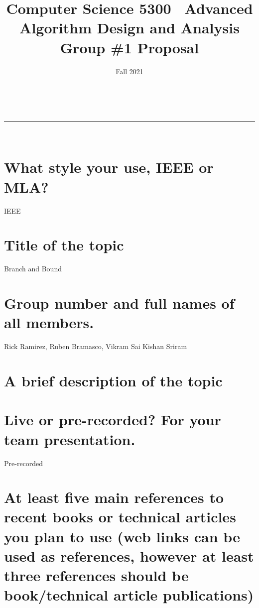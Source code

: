 \documentclass[11pt]{article}
\title{Computer Science 5300
\partition\
    Advanced Algorithm Design and Analysis\\
    \vspace{1ex}
    Group \#1 Proposal}
\author{\small }
\date{Fall 2021}
\makeatletter
\newcommand{\partition}{\rule{\linewidth}{0.8pt}}
\renewcommand{\maketitle}{
    \begin{center}
        \@date \hfill  \@author\\
        {\Large \textsc{\@title}}
        \partition\\
    \end{center}
}
\makeatother
\begin{document}
    \maketitle
    \section{What style your use, IEEE or MLA?}
        IEEE
    \section{Title of the topic}
        Branch and Bound
    \section{Group number and full names of all members.}
        Rick Ramirez, Ruben Bramasco, Vikram Sai Kishan Sriram
    \section{A brief description of the topic}
    \section{Live or pre-recorded? For your team presentation.}
        Pre-recorded
    \section{At least five main references to recent books or technical articles you plan to use
        (web links can be used as references, however at least three references should be book/technical article publications)}
\end{document}
